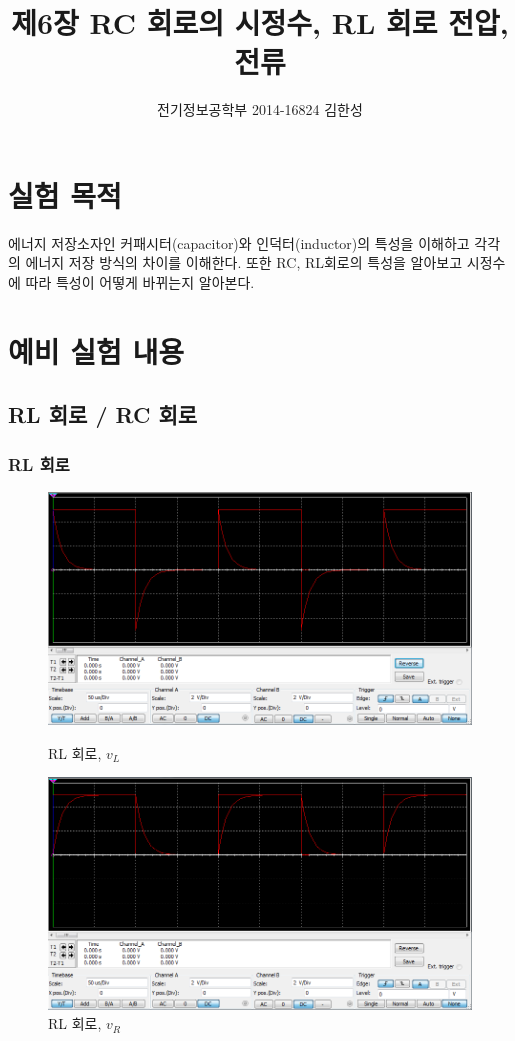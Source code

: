 \documentclass{article}
\title{제6장 RC 회로의 시정수, RL 회로 전압, 전류}
\author{전기정보공학부 2014-16824 김한성}
\date{}
\begin{document}
\maketitle


\section{실험 목적}
에너지 저장소자인 커패시터(capacitor)와 인덕터(inductor)의 특성을 이해하고 각각의
에너지 저장 방식의 차이를 이해한다. 또한 RC, RL회로의 특성을 알아보고 시정수에 따라
특성이 어떻게 바뀌는지 알아본다.


\section{예비 실험 내용}

\subsection{RL 회로 / RC 회로}
\subsubsection{RL 회로}

\begin{figure}[H]
\centering
\begin{minipage}{.5\textwidth}
	\centering
	\includegraphics[width=.9\linewidth]{1-a-v_l}
	\caption{RL 회로, $v_L$}
\end{minipage}%
\begin{minipage}{.5\textwidth}
	\centering
	\includegraphics[width=.9\linewidth]{1-a-v_r}
	\caption{RL 회로, $v_R$}
\end{minipage}
\end{figure}
\end{document}
